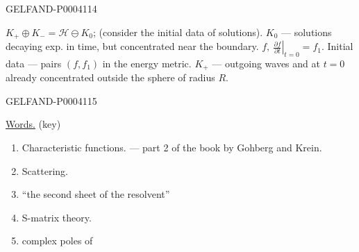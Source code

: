 \begin{GelfandAdjacentEvidence}{GELFAND-P000411}{4}


$K_+\oplus K_-=\mathcal H\ominus K_0$; (consider the initial data of solutions).
$K_0$ — solutions decaying exp. in time, but concentrated near the boundary.
$f,\ \left.\frac{\partial f}{\partial t}\right|_{t=0}=f_1$.
Initial data — pairs $(f, f_1)$ in the energy metric.
$K_+$ — outgoing waves and at $t=0$ already concentrated outside the sphere of radius $R$.
\end{GelfandAdjacentEvidence}
\begin{GelfandAdjacentEvidence}{GELFAND-P000411}{5}


\underline{Words.} (key)
\begin{enumerate}
\item Characteristic functions. — part 2 of the book by Gohberg and Krein.
\item Scattering.
\item “the second sheet of the resolvent”
\item S-matrix theory.
\item complex poles of

\end{enumerate}
\end{GelfandAdjacentEvidence}
